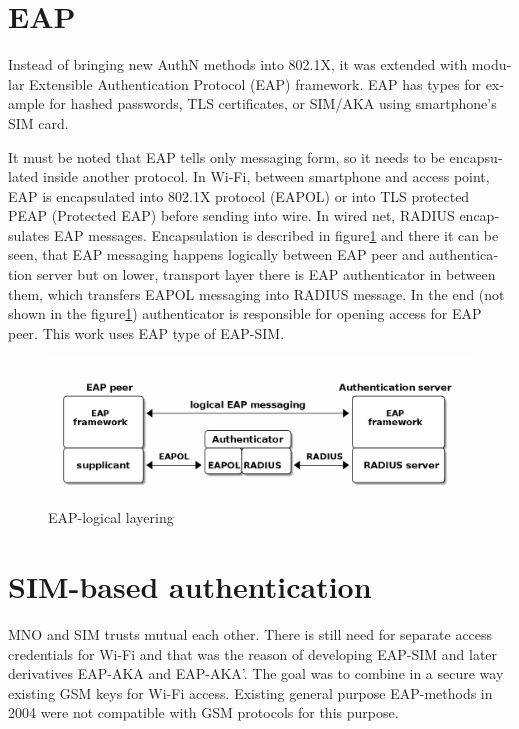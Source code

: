 \documentclass[12pt,a4paper,english]{tutthesis}
\begin{document}
\begin{otherlanguage}{english}
\section{EAP}
\label{sec-2-4}

Instead of bringing new AuthN methods into 802.1X, it was 
extended with modular Extensible Authentication Protocol (EAP) 
framework\cite{rfc5247}. EAP has types for example for hashed
passwords, TLS certificates, or SIM/AKA using smartphone's SIM card.

It must be noted that EAP tells only messaging form, so it needs
to be encapsulated inside another protocol.  In Wi-Fi, between
smartphone and access point, EAP is encapsulated into 802.1X protocol
(EAPOL) or into TLS protected PEAP (Protected EAP)\cite{peap} before
sending into wire. In wired net, RADIUS encapsulates EAP
messages. Encapsulation is described in figure\ref{fig:eap-layers}
and there it can be seen, that 
EAP messaging happens logically between EAP peer and authentication
server but on lower, transport layer there is EAP authenticator in
between them, which transfers EAPOL messaging into RADIUS message.
In the end (not shown in the figure\ref{fig:eap-layers}) authenticator is
responsible for opening access for EAP peer. This work uses EAP type of EAP-SIM.




\begin{figure}[htb]
\centering
\includegraphics[width=.9\linewidth]{eap-layer.png}
\caption{\label{fig:eap-layers}EAP-logical layering}
\end{figure}






\section{SIM-based authentication}
\label{sec-2-5}

MNO and SIM trusts mutual each other.
There is still need for separate access credentials for Wi-Fi and
that was the reason of developing EAP-SIM and later derivatives
EAP-AKA and EAP-AKA'.
The goal was to combine in a secure way existing GSM keys for Wi-Fi
access. Existing general purpose EAP-methods in 2004 were not
compatible with GSM protocols for this purpose.\cite[p.93]{hav-doc}



\end{otherlanguage}
\end{document}

